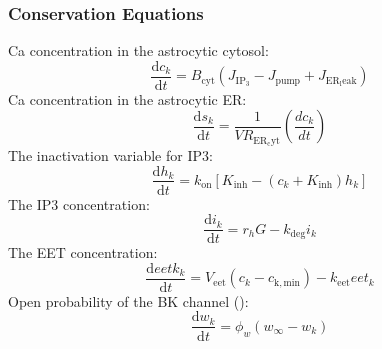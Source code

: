 \subsubsection{Conservation Equations}
\gls{Ca} concentration in the astrocytic cytosol:
\begin{equation} \label{eq:ckInt}
\dfrac{\mathrm{d}c_k}{\mathrm{d}t}= B_{\mathrm{cyt}}(J_{\mathrm{IP_3}}-J_{\mathrm{pump}}+J_{\mathrm{ER_leak}})
\end{equation}
%
\gls{Ca} concentration in the astrocytic \gls{ER}:
\begin{equation} \label{eq:skInt}
\dfrac{\mathrm{d}s_k}{\mathrm{d}t}= \frac{1}{VR_{\mathrm{ER_cyt}}}(\frac{dc_k}{dt})
\end{equation}
%
The inactivation variable for \gls{IP3}:
\begin{equation} \label{eq:hkInt}
\dfrac{\mathrm{d}h_k}{\mathrm{d}t}= k_{\mathrm{on}}[K_{\mathrm{inh}}-(c_k+K_{\mathrm{inh}})h_k]
\end{equation}
%
The \gls{IP3} concentration:
\begin{equation} \label{eq:ikInt}
\dfrac{\mathrm{d}i_k}{\mathrm{d}t}= r_hG-k_{\mathrm{deg}}i_k
\end{equation}
%
The EET concentration:
\begin{equation} \label{eq:eetkInt}
\dfrac{\mathrm{d}eetk_k}{\mathrm{d}t}= V_{\mathrm{eet}}(c_k-c_{\mathrm{k,min}})-k_{\mathrm{eet}}eet_k
\end{equation}
%
Open probability of the BK channel (\pers):
\begin{equation} \label{eq:dwkdt}
\frac{\mathrm{d}w_{k}}{\mathrm{d}t} = \phi_{w} \left(w_{\infty}-w_{k} \right) 
\end{equation}

